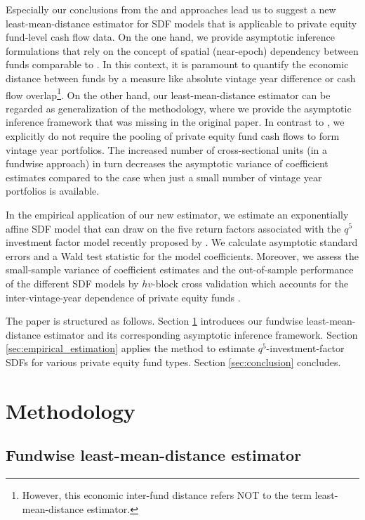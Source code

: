 \documentclass[12pt]{article}
\begin{document}
Especially our conclusions from the \cite{DLP12} and \cite{KN16} approaches lead us to suggest a new least-mean-distance estimator for SDF models that is applicable to private equity fund-level cash flow data.
On the one hand, we provide asymptotic inference formulations that rely on the concept of spatial (near-epoch) dependency between funds comparable to \cite{KN16}.
In this context, it is paramount to quantify the economic distance between funds by a measure like absolute vintage year difference or cash flow overlap\footnote{However, this economic inter-fund distance refers NOT to the term least-mean-distance estimator.}.
On the other hand, our least-mean-distance estimator can be regarded as generalization of the \cite{DLP12} methodology, where we provide the asymptotic inference framework that was missing in the original paper.
In contrast to \cite{DLP12}, we explicitly do not require the pooling of private equity fund cash flows to form vintage year portfolios.
The increased number of cross-sectional units (in a fundwise approach) in turn decreases the asymptotic variance of coefficient estimates compared to the case when just a small number of vintage year portfolios is available.

In the empirical application of our new estimator, we estimate an exponentially affine SDF model that can draw on the five return factors associated with the $q^5$ investment factor model recently proposed by \cite{HXZ20}.
We calculate asymptotic standard errors and a Wald test statistic for the model coefficients.
Moreover, we assess the small-sample variance of coefficient estimates and the out-of-sample performance of the different SDF models by $hv$-block cross validation which accounts for the inter-vintage-year dependence of private equity funds \citep{R00}.

The paper is structured as follows. 
Section \ref{sec:Methodology} introduces our fundwise least-mean-distance estimator and its corresponding asymptotic inference framework.
Section \ref{sec:empirical_estimation} applies the method to estimate $q^5$-investment-factor SDFs for various private equity fund types.
Section \ref{sec:conclusion} concludes.


\section{Methodology}
\label{sec:Methodology}

\subsection{Fundwise least-mean-distance estimator}
\end{document}
